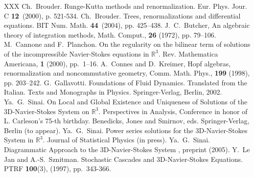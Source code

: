 \documentclass[a4paper,12pt,reqno]{amsart}
\newcommand{\1}{{\bf 1}}
\newcommand{\RR}{\mathbb{R}}
\begin{document}
\begin{thebibliography}{XXX}
 Ch.~Brouder. Runge-Kutta methods and renormalization. Eur. Phys. Jour. C \textbf{12}~(2000), p. 521-534.
 Ch.~Brouder. Trees, renormalizations and differential
equations. BIT Num. Math. \textbf{ 44}~(2004), pp. 425–438.
 J.~C.~Butcher, An algebraic theory of integration methods, Math. Comput., \textbf{26} (1972), 
pp. 79–106. 
 M.~Cannone and F.~Planchon. On the regularity on the
bilinear term of solutions of the incompressible Navier-Stokes
equations in $\RR^3$. Rev. Mathematica Americana, \textbf{1} (2000),
pp.~1--16.
 A.~Connes and D.~Kreimer, Hopf algebras, renormalization
and noncommutative geometry, Comm. Math. Phys., \textbf{199} (1998),
pp. 203–242.
 G.~Gallavotti. Foundations of Fluid Dynamics. Translated from
the Italian. Texts and Monographs in Physics. Springer-Verlag, Berlin, 2002.
 Ya.~G.~Sinai. On Local and Global Existence and
Uniqueness of Solutions of the 3D-Navier-Stokes System on $\RR^3$. 
Perspectives in Analysis, Conference in honor of L. Carleson’s 75-th 
birthday. Benedicks, Jones and Smirnov, eds. Springer-Verlag, Berlin (to appear).
 Ya.~G.~Sinai. Power series solutions for the
3D-Navier-Stokes System in $\RR^3$. Journal 
of Statistical Physics (in press).
 Ya.~G.~Sinai. Diagrammatic Approach to the 3D-Navier-Stokes System ,
preprint (2005).  
 Y.~Le Jan and A.-S.~Sznitman. Stochastic Cascades and
3D-Navier-Stokes Equations. PTRF \textbf{100}(3), (1997), pp.~343-366.
\end{thebibliography}

\appendix
\end{document}
